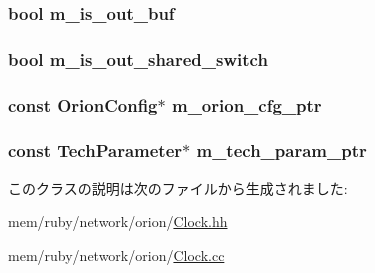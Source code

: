 \label{classClock_a9fd4e7ce42d4a34ec79cdcc596ab8337}
\hypertarget{classClock_a26ae4c597cc6adb05496a9793bcb0b1b}{
\subsubsection[{m\_\-is\_\-out\_\-buf}]{\setlength{\rightskip}{0pt plus 5cm}bool {\bf m\_\-is\_\-out\_\-buf}}}
\label{classClock_a26ae4c597cc6adb05496a9793bcb0b1b}
\hypertarget{classClock_a117999cd421d4f36ae63ed097adf937a}{
\subsubsection[{m\_\-is\_\-out\_\-shared\_\-switch}]{\setlength{\rightskip}{0pt plus 5cm}bool {\bf m\_\-is\_\-out\_\-shared\_\-switch}}}
\label{classClock_a117999cd421d4f36ae63ed097adf937a}
\hypertarget{classClock_a84de60ae1f7ca812df5347e27a658c77}{
\subsubsection[{m\_\-orion\_\-cfg\_\-ptr}]{\setlength{\rightskip}{0pt plus 5cm}const {\bf OrionConfig}$\ast$ {\bf m\_\-orion\_\-cfg\_\-ptr}}}
\label{classClock_a84de60ae1f7ca812df5347e27a658c77}
\hypertarget{classClock_a11d1644aa2bfe0e16783dface6fadf13}{
\subsubsection[{m\_\-tech\_\-param\_\-ptr}]{\setlength{\rightskip}{0pt plus 5cm}const {\bf TechParameter}$\ast$ {\bf m\_\-tech\_\-param\_\-ptr}}}
\label{classClock_a11d1644aa2bfe0e16783dface6fadf13}


このクラスの説明は次のファイルから生成されました:\begin{DoxyCompactItemize}
\item 
mem/ruby/network/orion/\hyperlink{Clock_8hh}{Clock.hh}\item 
mem/ruby/network/orion/\hyperlink{Clock_8cc}{Clock.cc}\end{DoxyCompactItemize}
